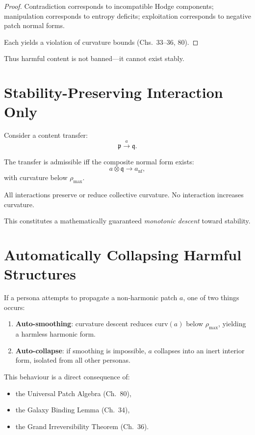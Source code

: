 \begin{proof}
Contradiction corresponds to incompatible Hodge components;
manipulation corresponds to entropy deficits;
exploitation corresponds to negative patch normal forms.

Each yields a violation of curvature bounds  
(Chs.~33--36, 80).
\end{proof}

Thus harmful content is not banned---it cannot exist stably.

\section{Stability-Preserving Interaction Only}

Consider a content transfer:
\[
\mathfrak{p} \stackrel{a}{\longrightarrow} \mathfrak{q}.
\]

The transfer is admissible iff the composite normal form exists:
\[
a \otimes \mathfrak{q} \to a_{\mathrm{nf}},
\]
with curvature below $\rho_{\max}$.

\begin{invariant}
All interactions preserve or reduce collective curvature.
No interaction increases curvature.
\end{invariant}

This constitutes a mathematically guaranteed
\emph{monotonic descent} toward stability.

\section{Automatically Collapsing Harmful Structures}

If a persona attempts to propagate a non-harmonic patch $a$,
one of two things occurs:

\begin{enumerate}
\item \textbf{Auto-smoothing}:  
curvature descent reduces $\mathrm{curv}(a)$ below $\rho_{\max}$,
yielding a harmless harmonic form.

\item \textbf{Auto-collapse}:  
if smoothing is impossible,
$a$ collapses into an inert interior form,
isolated from all other personas.
\end{enumerate}

This behaviour is a direct consequence of:

\begin{itemize}
    \item the Universal Patch Algebra (Ch.~80),
    \item the Galaxy Binding Lemma (Ch.~34),
    \item the Grand Irreversibility Theorem (Ch.~36).
\end{itemize}

